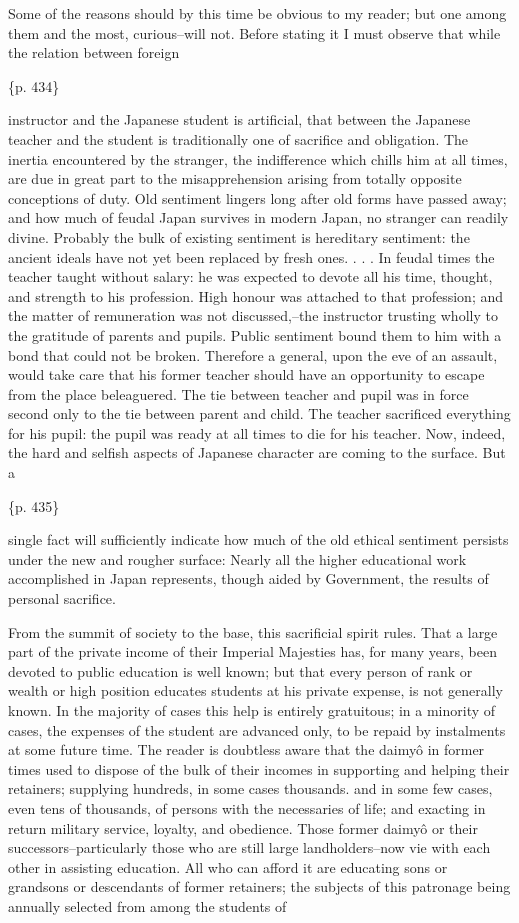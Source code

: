 Some of the reasons should by this time be obvious to my reader; but one among them and the most, curious--will not. Before stating it I must observe that while the relation between foreign

\{p. 434\}

instructor and the Japanese student is artificial, that between the Japanese teacher and the student is traditionally one of sacrifice and obligation. The inertia encountered by the stranger, the indifference which chills him at all times, are due in great part to the misapprehension arising from totally opposite conceptions of duty. Old sentiment lingers long after old forms have passed away; and how much of feudal Japan survives in modern Japan, no stranger can readily divine. Probably the bulk of existing sentiment is hereditary sentiment: the ancient ideals have not yet been replaced by fresh ones. . . . In feudal times the teacher taught without salary: he was expected to devote all his time, thought, and strength to his profession. High honour was attached to that profession; and the matter of remuneration was not discussed,--the instructor trusting wholly to the gratitude of parents and pupils. Public sentiment bound them to him with a bond that could not be broken. Therefore a general, upon the eve of an assault, would take care that his former teacher should have an opportunity to escape from the place beleaguered. The tie between teacher and pupil was in force second only to the tie between parent and child. The teacher sacrificed everything for his pupil: the pupil was ready at all times to die for his teacher. Now, indeed, the hard and selfish aspects of Japanese character are coming to the surface. But a

\{p. 435\}

single fact will sufficiently indicate how much of the old ethical sentiment persists under the new and rougher surface: Nearly all the higher educational work accomplished in Japan represents, though aided by Government, the results of personal sacrifice.

From the summit of society to the base, this sacrificial spirit rules. That a large part of the private income of their Imperial Majesties has, for many years, been devoted to public education is well known; but that every person of rank or wealth or high position educates students at his private expense, is not generally known. In the majority of cases this help is entirely gratuitous; in a minority of cases, the expenses of the student are advanced only, to be repaid by instalments at some future time. The reader is doubtless aware that the daimyô in former times used to dispose of the bulk of their incomes in supporting and helping their retainers; supplying hundreds, in some cases thousands. and in some few cases, even tens of thousands, of persons with the necessaries of life; and exacting in return military service, loyalty, and obedience. Those former daimyô or their successors--particularly those who are still large landholders--now vie with each other in assisting education. All who can afford it are educating sons or grandsons or descendants of former retainers; the subjects of this patronage being annually selected from among the students of

